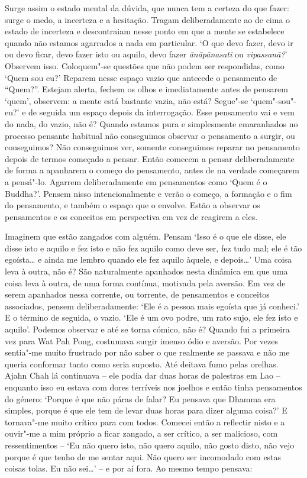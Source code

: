 Surge assim o estado mental da dúvida, que nunca tem a certeza do que
fazer: surge o medo, a incerteza e a hesitação. Tragam deliberadamente
ao de cima o estado de incerteza e descontraiam nesse ponto em que a
mente se estabelece quando não estamos agarrados a nada em particular.
`O que devo fazer, devo ir ou devo ficar, devo fazer isto ou aquilo,
devo fazer \emph{ānāpānasati} ou \emph{vipassanā?}' Observem isso.
Coloquem"-se questões que não podem ser respondidas, como `Quem sou eu?'
Reparem nesse espaço vazio que antecede o pensamento de ``Quem?''.
Estejam alerta, fechem os olhos e imediatamente antes de pensarem
`quem', observem: a mente está bastante vazia, não está? Segue"-se
`quem"-sou"-eu?' e de seguida um espaço depois da interrogação. Esse
pensamento vai e vem do nada, do vazio, não é? Quando estamos pura e
simplesmente emaranhados no processo pensante habitual não conseguimos
observar o pensamento a surgir, ou conseguimos? Não conseguimos ver,
somente conseguimos reparar no pensamento depois de termos começado a
pensar. Então comecem a pensar deliberadamente de forma a apanharem o
começo do pensamento, antes de na verdade começarem a pensá"-lo. Agarrem
deliberadamente em pensamentos como
`Quem é o Buddha?'. Pensem nisso intencionalmente e verão o começo, a
formação e o fim do pensamento, e também o espaço que o envolve. Estão a
observar os pensamentos e os conceitos em perspectiva em vez de reagirem
a eles.

Imaginem que estão zangados com alguém. Pensam `Isso é o que ele disse,
ele disse isto e aquilo e fez isto e não fez aquilo como deve ser, fez
tudo mal; ele é tão egoísta\ldots{} e ainda me lembro quando ele fez
aquilo àquele, e depois\ldots{}' Uma coisa leva à outra, não é? São
naturalmente apanhados nesta dinâmica em que uma coisa leva à outra, de
uma forma contínua, motivada pela aversão. Em vez de serem apanhados
nessa corrente, ou torrente, de pensamentos e conceitos associados,
pensem deliberadamente: `Ele é a pessoa mais egoísta que já conheci.' E
o término de seguida, o vazio. `Ele é um ovo podre, um rato sujo, ele
fez isto e aquilo'. Podemos observar e até se torna cómico, não é?
Quando fui a primeira vez para Wat Pah Pong, costumava surgir imenso 
ódio e aversão. Por vezes sentia"-me muito frustrado por não saber
o que realmente se passava e não me queria conformar tanto como seria
suposto. Até deitava fumo pelas orelhas. Ajahn Chah lá continuava -- ele
podia dar duas horas de palestras em Lao -- enquanto isso eu estava com
dores terríveis nos joelhos e então tinha pensamentos do género: `Porque
é que não páras de falar? Eu pensava que Dhamma era simples, porque é
que ele tem de levar duas horas para dizer alguma coisa?'
E tornava"-me muito crítico para com todos. Comecei então a
reflectir nisto e a ouvir"-me a mim próprio a ficar zangado, a ser
crítico, a ser malicioso, com ressentimentos -- `Eu não quero isto, não
quero aquilo, não gosto disto, não vejo porque é que tenho de me sentar
aqui. Não quero ser incomodado com estas coisas tolas. Eu não
sei\ldots{}' -- e por aí fora. Ao mesmo tempo pensava:

